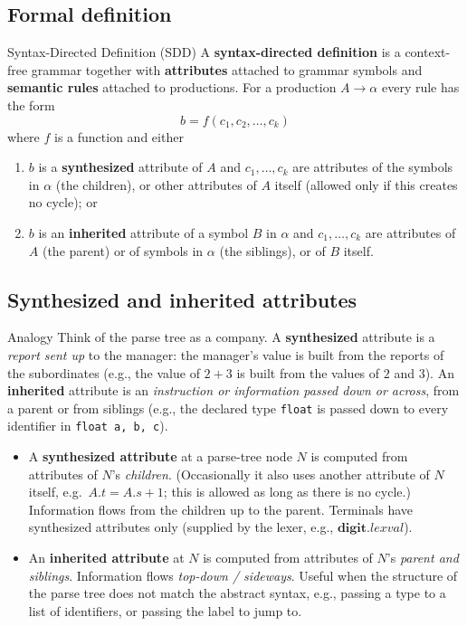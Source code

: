\documentclass[11pt,a4paper]{article}
\newcommand{\at}[2]{\ensuremath{#1.\mathit{#2}}}
\begin{document}
\subsection{Formal definition}
\begin{defbox}{Syntax-Directed Definition (SDD)}
A \textbf{syntax-directed definition} is a context-free grammar together with \textbf{attributes} attached to grammar symbols and \textbf{semantic rules} attached to productions. For a production $A \to \alpha$ every rule has the form
\[
b = f(c_1, c_2, \dots, c_k)
\]
where $f$ is a function and either
\begin{enumerate}[label=(\arabic*),nosep]
\item $b$ is a \textbf{synthesized} attribute of $A$ and $c_1,\dots,c_k$ are attributes of the symbols in $\alpha$ (the children), or other attributes of $A$ itself (allowed only if this creates no cycle); or
\item $b$ is an \textbf{inherited} attribute of a symbol $B$ in $\alpha$ and $c_1,\dots,c_k$ are attributes of $A$ (the parent) or of symbols in $\alpha$ (the siblings), or of $B$ itself.
\end{enumerate}
\end{defbox}

\subsection{Synthesized and inherited attributes}
\begin{notebox}{Analogy}
Think of the parse tree as a company. A \textbf{synthesized} attribute is a \emph{report sent up} to the manager: the manager's value is built from the reports of the subordinates (e.g., the value of $2+3$ is built from the values of $2$ and $3$). An \textbf{inherited} attribute is an \emph{instruction or information passed down or across}, from a parent or from siblings (e.g., the declared type \texttt{float} is passed down to every identifier in \texttt{float a, b, c}).
\end{notebox}

\begin{itemize}
\item A \textbf{synthesized attribute} at a parse-tree node $N$ is computed from attributes of $N$'s \emph{children}. (Occasionally it also uses another attribute of $N$ itself, e.g.\ $\at{A}{t}=\at{A}{s}+1$; this is allowed as long as there is no cycle.) Information flows from the children up to the parent. Terminals have synthesized attributes only (supplied by the lexer, e.g., \at{\mathbf{digit}}{lexval}).
\item An \textbf{inherited attribute} at $N$ is computed from attributes of $N$'s \emph{parent and siblings}. Information flows \emph{top-down / sideways}. Useful when the structure of the parse tree does not match the abstract syntax, e.g., passing a type to a list of identifiers, or passing the label to jump to.
\end{itemize}
\end{document}
